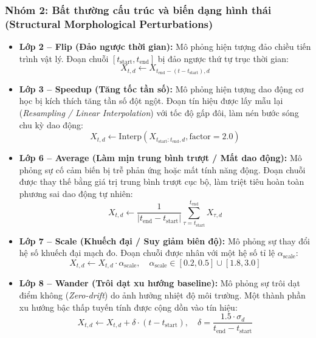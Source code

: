 \documentclass[11pt,journal,onecolumn]{IEEEtran}
\begin{document}
\subsubsection{Nhóm 2: Bất thường cấu trúc và biến dạng hình thái (Structural Morphological Perturbations)}
\begin{itemize}
    \item \textbf{Lớp 2 -- Flip (Đảo ngược thời gian):} Mô phỏng hiện tượng đảo chiều tiến trình vật lý. Đoạn chuỗi $[t_{\text{start}}, t_{\text{end}}]$ bị đảo ngược thứ tự trục thời gian:
    \begin{equation}
    X_{t, d} \leftarrow X_{t_{\text{end}} - (t - t_{\text{start}}), d}
    \end{equation}
    
    \item \textbf{Lớp 3 -- Speedup (Tăng tốc tần số):} Mô phỏng hiện tượng dao động cơ học bị kích thích tăng tần số đột ngột. Đoạn tín hiệu được lấy mẫu lại (\textit{Resampling / Linear Interpolation}) với tốc độ gấp đôi, làm nén bước sóng chu kỳ dao động:
    \begin{equation}
    X_{t, d} \leftarrow \text{Interp}(X_{t_{\text{start}}:t_{\text{end}}, d}, \text{factor} = 2.0)
    \end{equation}
    
    \item \textbf{Lớp 6 -- Average (Làm mịn trung bình trượt / Mất dao động):} Mô phỏng sự cố cảm biến bị trễ phản ứng hoặc mất tính năng động. Đoạn chuỗi được thay thế bằng giá trị trung bình trượt cục bộ, làm triệt tiêu hoàn toàn phương sai dao động tự nhiên:
    \begin{equation}
    X_{t, d} \leftarrow \frac{1}{|t_{\text{end}} - t_{\text{start}}|} \sum_{\tau = t_{\text{start}}}^{t_{\text{end}}} X_{\tau, d}
    \end{equation}
    
    \item \textbf{Lớp 7 -- Scale (Khuếch đại / Suy giảm biên độ):} Mô phỏng sự thay đổi hệ số khuếch đại mạch đo. Đoạn chuỗi được nhân với một hệ số tỉ lệ $\alpha_{\text{scale}}$:
    \begin{equation}
    X_{t, d} \leftarrow X_{t, d} \cdot \alpha_{\text{scale}}, \quad \alpha_{\text{scale}} \in [0.2, 0.5] \cup [1.8, 3.0]
    \end{equation}
    
    \item \textbf{Lớp 8 -- Wander (Trôi dạt xu hướng baseline):} Mô phỏng sự trôi dạt điểm không (\textit{Zero-drift}) do ảnh hưởng nhiệt độ môi trường. Một thành phần xu hướng bậc thấp tuyến tính được cộng dồn vào tín hiệu:
    \begin{equation}
    X_{t, d} \leftarrow X_{t, d} + \delta \cdot (t - t_{\text{start}}), \quad \delta = \frac{1.5 \cdot \sigma_d}{t_{\text{end}} - t_{\text{start}}}
    \end{equation}
    

\end{itemize}
\end{document}
